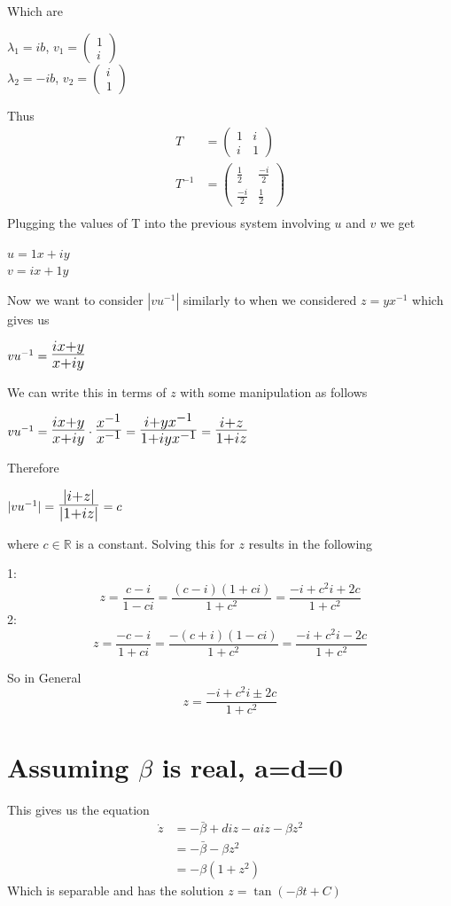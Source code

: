 \documentclass[10pt]{article}
\def\mathLarge#1{\mbox{\LARGE $#1$}}
\begin{document}
Which are
\begin{center}
$\lambda_{1} = ib$, $v_{1} = \begin{pmatrix}1\\i\end{pmatrix}$\\
$\lambda_{2} = -ib$, $v_{2} = \begin{pmatrix}i\\1\end{pmatrix}$\\
\end{center}
Thus
\begin{align*}
T &= \begin{pmatrix}1&i\\i&1\end{pmatrix}\\
T^{-1} &= \begin{pmatrix}\frac{1}{2}&\frac{-i}{2}\\[6pt]\frac{-i}{2}&\frac{1}{2}\end{pmatrix}\\
\end{align*}
Plugging the values of T into the previous system involving $u$ and $v$ we get
\begin{center}
$u = 1x + iy$\\
$v = ix + 1y$
\end{center}
Now we want to consider $|vu^{-1}|$ similarly to when we considered $z=yx^{-1}$ which gives us
\begin{center}
$vu^{-1} = \mathLarge{\frac{ix + y}{x + iy}}$
\end{center}
We can write this in terms of $z$ with some manipulation as follows
\begin{center}
$vu^{-1} = \mathLarge{\frac{ix + y}{x + iy}}\cdot\mathLarge{\frac{x^{-1}}{x^{-1}}}=
\mathLarge{\frac{i + yx^{-1}}{1 + iyx^{-1}}} = \mathLarge{\frac{i + z}{1 + iz}}$
\end{center}
Therefore
\begin{center}
$|vu^{-1}| = \mathLarge{\frac{|i + z|}{|1 + iz|}} = c$
\end{center}
where $c \in \mathbb R$ is a constant. Solving this for $z$ results in the following


1:
$$z = \frac{c-i}{1-ci}=\frac{(c-i)(1+ci)}{1+c^2}=\frac{-i+c^2i+2c}{1+c^2}$$
2:
$$ z = \frac{-c-i}{1+ci}=\frac{-(c+i)(1-ci)}{{1+c^2}}=\frac{-i+c^2i-2c}{{1+c^2}}$$

So in General
$$ z = \frac{-i+c^2i\pm2c}{{1+c^2}}$$

\section{Assuming $\beta$ is real, a=d=0}
This gives us the equation
\begin{align*}
\dot z&=-\bar\beta+diz-aiz-\beta z^2\\
&=-\bar\beta-\beta z^2\\
&=-\beta(1+z^2)
\end{align*}
Which is separable and has the solution $z=\tan(-\beta t+C)$
\end{document}
